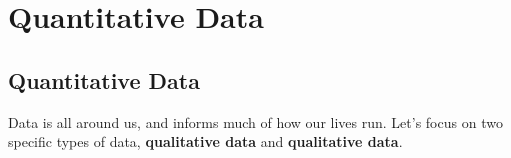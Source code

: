 \documentclass[notes]{subfiles}
\begin{document}
	\fancyhead[LO,RE]{\bfseries \currentname}
	\fancyfoot[C]{{}}
	\fancyfoot[RO,LE]{\large \thepage}	%

\section*{Quantitative Data}\label{quantdata}
	\subsection*{Quantitative Data}	
		Data is all around us, and informs much of how our lives run.  Let's focus on two specific types of data, \textbf{qualitative data} and \textbf{qualitative data}.

		

\clearpage
\end{document}

